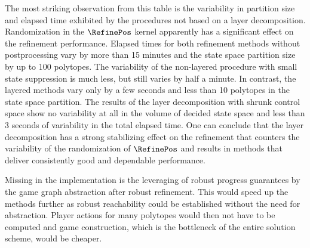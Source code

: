     The most striking observation from this table is the variability in partition size and elapsed time exhibited by the procedures not based on a layer decomposition.
    Randomization in the $\RefinePos$ kernel apparently has a significant effect on the refinement performance.
    Elapsed times for both refinement methods without postprocessing vary by more than 15 minutes and the state space partition size by up to 100 polytopes.
    The variability of the non-layered procedure with small state suppression is much less, but still varies by half a minute.
    In contrast, the layered methods vary only by a few seconds and less than 10 polytopes in the state space partition.
    The results of the layer decomposition with shrunk control space show no variability at all in the volume of decided state space and less than 3 seconds of variability in the total elapsed time.
    One can conclude that the layer decomposition has a strong stabilizing effect on the refinement that counters the variability of the randomization of $\RefinePos$ and results in methods that deliver consistently good and dependable performance.


    Missing in the implementation is the leveraging of robust progress guarantees by the game graph abstraction after robust refinement.
    This would speed up the methods further as robust reachability could be established without the need for abstraction.
    Player actions for many polytopes would then not have to be computed and game construction, which is the bottleneck of the entire solution scheme, would be cheaper.


